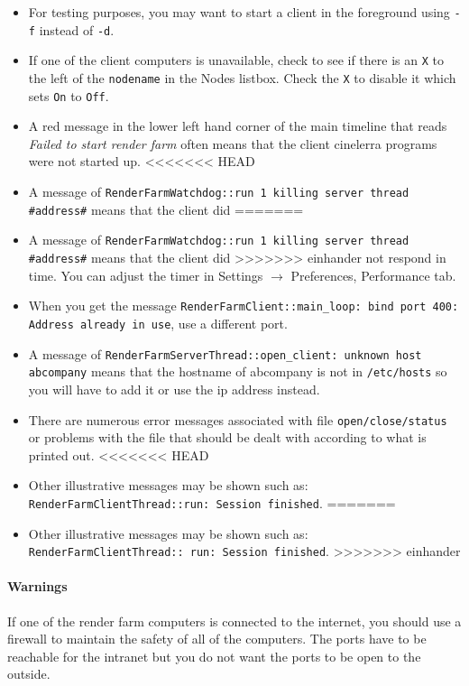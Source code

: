\begin{itemize}
    \item For testing purposes, you may want to start a client in the foreground using \texttt{-f} instead of \texttt{-d}.
    \item If one of the client computers is unavailable, check to see if there is an \texttt{X} to the left of the \texttt{nodename}
    in the Nodes listbox.  Check the \texttt{X} to disable it which sets \texttt{On} to \texttt{Off}.
    \item A red message in the lower left hand corner of the main timeline that reads \textit{Failed to start render
    farm} often means that the client cinelerra programs were not started up.
<<<<<<< HEAD
    \item A message of \texttt{RenderFarmWatchdog::run 1 killing server thread \#address\#} means that the client did
=======
    \item A message of \texttt{RenderFarmWatchdog::run 1 killing server thread \\ \#address\#} means that the client did
>>>>>>> einhander
    not respond in time.  You can adjust the timer in Settings $\rightarrow$ Preferences, Performance tab.
    \item When you get the message \texttt{RenderFarmClient::main\_loop: bind port 400: Address already in use}, use a different port.
    \item A message of \texttt{RenderFarmServerThread::open\_client: unknown host abcompany} means that the
    hostname of abcompany is not in \texttt{/etc/hosts} so you will have to add it or use the ip address instead.
    \item There are numerous error messages associated with file \texttt{open/close/status} or problems with the file
    that should be dealt with according to what is printed out.
<<<<<<< HEAD
    \item Other illustrative messages may be shown such as: \texttt{RenderFarmClientThread::run: Session finished}.
=======
    \item Other illustrative messages may be shown such as: \texttt{RenderFarmClientThread:: run: Session finished}.
>>>>>>> einhander
\end{itemize}

\paragraph{Warnings}

If one of the render farm computers is connected to the internet, you should use a firewall to maintain the safety of all of the computers.  The ports have to be reachable for the intranet but you do not want the ports to be open to the outside.

